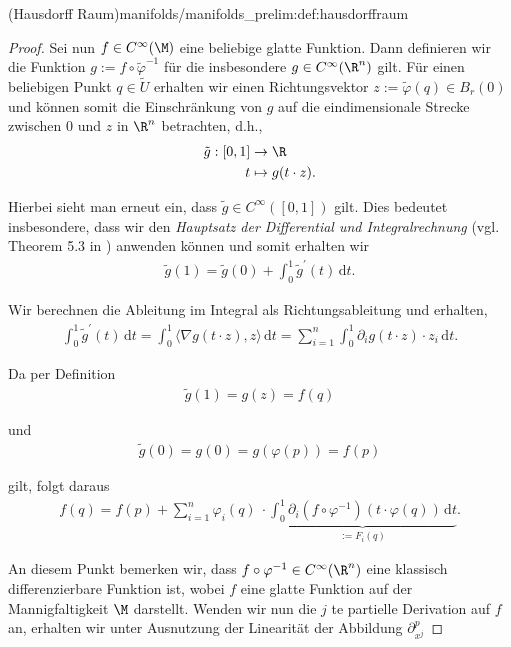\documentclass[letterpaper,10pt,english]{jupyterBook}
\begin{document}
\begin{definition}{(Hausdorff Raum)}{manifolds/manifolds_prelim:def:hausdorffraum}
\begin{proof}
\par
Sei nun \(f\in C^\infty(\M)\) eine beliebige glatte Funktion.
Dann definieren wir die Funktion \(g:= f\circ \tilde{\varphi}^{-1}\) für die insbesondere \(g\in C^\infty(\R^n)\) gilt.
Für einen beliebigen Punkt \(q\in\tilde{U}\) erhalten wir einen Richtungsvektor \(z:=\tilde{\varphi}(q)\in B_r(0)\) und können somit die Einschränkung von \(g\) auf die eindimensionale Strecke zwischen \(0\) und \(z\) in \(\R^n\) betrachten, d.h.,
\begin{align*}
\tilde{g}:[0,1] &\to\R\\
t&\mapsto g(t\cdot z).
\end{align*}
\par
Hierbei sieht man erneut ein, dass \(\tilde{g}\in C^\infty([0,1])\) gilt.
Dies bedeutet insbesondere, dass wir den \emph{Hauptsatz der Differential  und Integralrechnung} (vgl. Theorem 5.3 in \cite{Ten21}) anwenden können und somit erhalten wir
\begin{align*}
\tilde{g}(1) = \tilde{g}(0) + \int_{0}^1 \tilde{g}^\prime(t)\,\mathrm{d}t.
\end{align*}
\par
Wir berechnen die Ableitung im Integral als Richtungsableitung und erhalten,
\begin{align*}
\int_{0}^1 \tilde{g}^\prime(t) \,\mathrm{d}t
=\int_{0}^1 \langle \nabla g (t\cdot z), z \rangle \,\mathrm{d}t
=\sum_{i=1}^{n} \int_{0}^1  \partial_i g (t\cdot z) \cdot z_i \,\mathrm{d}t.
\end{align*}
\par
Da per Definition
\begin{align*}
\tilde{g}(1) = g(z)=f(q)
\end{align*}
\par
und
\begin{align*}
\tilde{g}(0) = g(0) = g(\varphi(p))=f(p)
\end{align*}
\par
gilt, folgt daraus
\begin{align*}
f(q) = 
f(p) + 
\sum_{i=1}^{n} \varphi_i(q)\ \cdot \underbrace{\int_{0}^1  \partial_i (f\circ \varphi^{-1})(t\cdot \varphi(q)) \, \mathrm{d}t}_{:=F_i(q)}.
\end{align*}
\par
An diesem Punkt bemerken wir, dass \(f\circ \varphi^{-1} \in C^\infty(\R^n)\) eine klassisch differenzierbare Funktion ist, wobei \(f\) eine glatte Funktion auf der Mannigfaltigkeit \(\M\) darstellt.
Wenden wir nun die \(j\) te partielle Derivation auf \(f\) an, erhalten wir unter Ausnutzung der Linearität der Abbildung \(\partial_{x^j}^p\)

\end{proof}
\end{definition}
\end{document}
